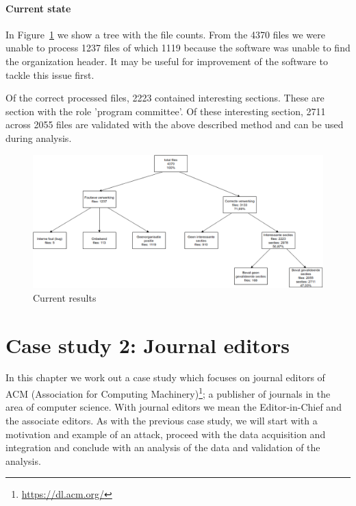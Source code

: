 \documentclass{ou-report}
\begin{document}
\subsubsection{Current state}
In Figure~\ref{fig:front_matter_result} we show a tree with the file counts.
From the 4370 files we were unable to process 1237 files of which 1119 
because the software was unable to find the organization header. It may be
useful for improvement of the software to tackle this issue first.

Of the correct processed files, 2223 contained interesting sections. These are
section with the role 'program committee'. Of these interesting section, 2711
across 2055 files are validated with the above described method and can be used
during analysis.

\begin{figure}[H]
    \centering
    \includegraphics[width=17cm]{images/lncs_front_matter_result.drawio.png}
    \caption{Current results}
    \label{fig:front_matter_result}
\end{figure}

\chapter{Case study 2: Journal editors}
\label{chp:case2}
In this chapter we work out a case study which focuses on journal editors of 
ACM (Association for Computing Machinery)\footnote{\url{https://dl.acm.org/}}; 
a publisher of journals in the area of computer science.
With journal editors we mean the Editor-in-Chief and the associate editors.
As with the previous case study, we will start with a motivation and example of
an attack, proceed with the data acquisition and integration and conclude with
an analysis of the data and validation of the analysis.
\end{document}
